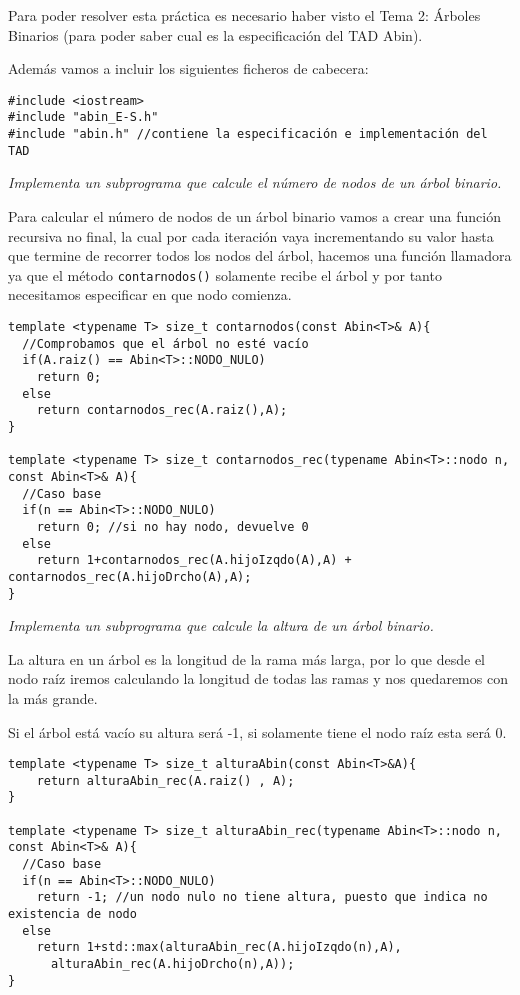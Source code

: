 Para poder resolver esta práctica es necesario haber visto el Tema 2: Árboles Binarios (para poder saber cual es la especificación del TAD Abin).

Además vamos a incluir los siguientes ficheros de cabecera:
\begin{verbatim}
#include <iostream>
#include "abin_E-S.h"
#include "abin.h" //contiene la especificación e implementación del TAD
\end{verbatim}

\textbf{\large{}}\textit{ Implementa un subprograma que calcule el número de nodos de un árbol binario.}

Para calcular el número de nodos de un árbol binario vamos a crear una función recursiva no final, la cual por cada iteración vaya incrementando su valor hasta que termine de recorrer todos los nodos del árbol, hacemos una función llamadora ya que el método \texttt{contarnodos()} solamente recibe el árbol y por tanto necesitamos especificar en que nodo comienza.
\begin{verbatim}
template <typename T> size_t contarnodos(const Abin<T>& A){
  //Comprobamos que el árbol no esté vacío
  if(A.raiz() == Abin<T>::NODO_NULO)
    return 0;
  else
    return contarnodos_rec(A.raiz(),A);
}

template <typename T> size_t contarnodos_rec(typename Abin<T>::nodo n, const Abin<T>& A){
  //Caso base
  if(n == Abin<T>::NODO_NULO)
    return 0; //si no hay nodo, devuelve 0
  else
    return 1+contarnodos_rec(A.hijoIzqdo(A),A) + contarnodos_rec(A.hijoDrcho(A),A);
}
\end{verbatim}

\textbf{\large{}}\textit{ Implementa un subprograma que calcule la altura de un árbol binario.}

La altura en un árbol es la longitud de la rama más larga, por lo que desde el nodo raíz iremos calculando la longitud de todas las ramas y nos quedaremos con la más grande.

Si el árbol está vacío su altura será -1, si solamente tiene el nodo raíz esta será 0.
\begin{verbatim}
template <typename T> size_t alturaAbin(const Abin<T>&A){
    return alturaAbin_rec(A.raiz() , A);
}

template <typename T> size_t alturaAbin_rec(typename Abin<T>::nodo n, const Abin<T>& A){
  //Caso base
  if(n == Abin<T>::NODO_NULO)
    return -1; //un nodo nulo no tiene altura, puesto que indica no existencia de nodo
  else
    return 1+std::max(alturaAbin_rec(A.hijoIzqdo(n),A),
      alturaAbin_rec(A.hijoDrcho(n),A));
}
\end{verbatim}

